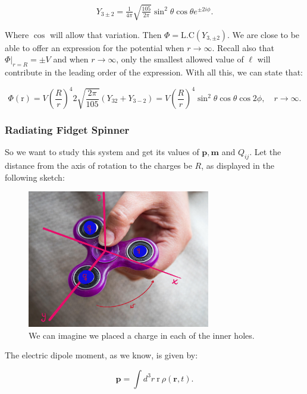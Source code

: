 \begin{equation}
	Y_{3 \pm 2} = \tfrac{1}{4\pi} \sqrt{\tfrac{105}{2\pi}} \sin^{2}\theta \cos \theta e^{\pm 2 i \phi}. 
\end{equation}

Where $\cos$ will allow that variation. Then $\Phi = \text{L.C} \left(Y_{3, \pm2}\right)$. We are close to be able to offer an expression for the potential when $r \rightarrow \infty$. Recall also that $\Phi|_{r=R} = \pm V$ and when $r\rightarrow \infty$, only the smallest allowed value of $\ell$ will contribute in the leading order of the expression. With all this, we can state that: 
	
\begin{equation}
	\Phi(\mathrm{r})=V\left(\frac{R}{r}\right)^{4} 2 \sqrt{\frac{2 \pi}{105}}\left(Y_{32}+Y_{3-2}\right)=V\left(\frac{R}{r}\right)^{4} \sin ^{2} \theta \cos \theta \cos 2 \phi, \quad r \rightarrow \infty.
\end{equation}


\subsubsection{Radiating Fidget Spinner}\label{Radiating Fidget Spinner}

So we want to study this system and get its values of $\mathbf{p}, \mathbf{m}$ and $Q_{ij}$. Let the distance from the axis of rotation to the charges be $R$, as displayed in the following sketch:

\begin{figure}[h]
	\includegraphics[width=8cm]{figures/Fidgetspinners.png}
	\centering
	\caption{We can imagine we placed a charge in each of the inner holes.}
\end{figure}

The electric dipole moment, as we know, is given by:

\begin{equation}
	\mathbf{p}=\int d^{3} r \:\mathrm{r} \:\rho(\mathbf{r}, t).
\end{equation}

